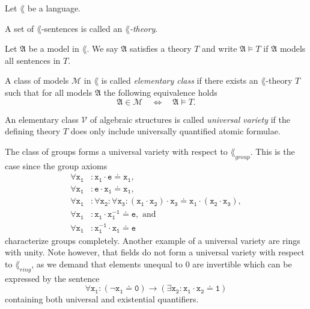 \begin{defin}
  Let \(\lang\) be a language.
  \begin{thmlist}
    \item A set of \(\lang\)-sentences is called an \emph{\(\lang\)-theory}.

    \item Let \(\mathfrak{A}\) be a model in \(\lang\). We say \(\mathfrak{A}\)
    satisfies a theory \(T\) and write \(\mathfrak{A} \models T\) if
    \(\mathfrak{A}\) models all sentences in \(T\).

    \item A class of models \(\mathcal{M}\) in \(\lang\) is called
    \emph{elementary class} if there exists an \(\lang\)-theory \(T\) such that
    for all models
    \(\mathfrak{A}\) the following equivalence holds
    \[
      \mathfrak{A} ∈ \mathcal{M} \quad ⇔ \quad \mathfrak{A} \models T.
    \]

    \item An elementary class \(\mathcal{V}\) of algebraic structures is called
    \emph{universal variety} if the defining theory \(T\) does only include
    universally quantified atomic formulae.
  \end{thmlist}
\end{defin}

\begin{exam}
  The class of groups forms a universal variety with respect to
  \(\lang_{group}\). This is the case since the group axioms
  \begin{align*}
     \mathtt{∀ x_1 } & \mathtt{: x_1 \cdot e \doteq x_1},\\
     \mathtt{∀ x_1 } & \mathtt{: e \cdot x_1 \doteq x_1},\\
     \mathtt{∀ x_1 } & \mathtt{: ∀ x_2 : ∀ x_3 :
             (x_1 \cdot x_2) \cdot x_3 \doteq x_1 \cdot (x_2 \cdot x_3)},\\
     \mathtt{∀ x_1 } & \mathtt{: x_1 \cdot x_1^{-1} \doteq e}, \text{ and}\\
     \mathtt{∀ x_1 } & \mathtt{: x_1^{-1} \cdot x_1 \doteq e}
  \end{align*}
  characterize groups completely. Another example of a universal variety are
  rings with unity. Note however, that fields do not form a universal variety
  with respect to \(\lang_{ring}\), as we demand that elements unequal to \(0\)
  are invertible which can be expressed by the sentence
  \[
    \mathtt{∀ x_1 : (¬ x_1 \doteq 0) → (∃ x_2 : x_1 \cdot x_2 \doteq 1)}
  \]
  containing both universal and existential quantifiers.
\end{exam}

